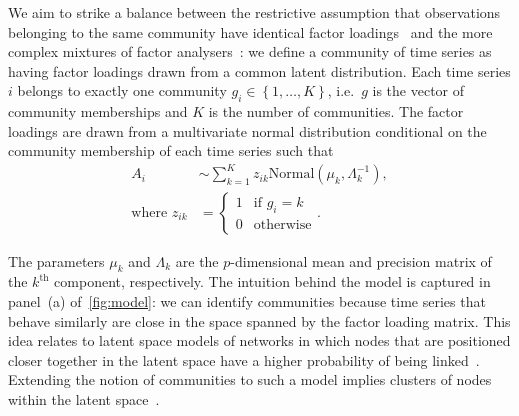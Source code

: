 \documentclass[onecolumn,pre,superscriptaddress, longbibliography, nofootinbib, notitlepage]{revtex4-1}
\newcommand{\dist}{\sim}
\newcommand{\normal}{\mathrm{Normal}}
\begin{document}
We aim to strike a balance between the restrictive assumption that observations belonging to the same community have identical factor loadings~\cite{Inoue2007} and the more complex mixtures of factor analysers~\cite{Tipping1999}: we define a community of time series as having factor loadings drawn from a common latent distribution. Each time series $i$ belongs to exactly one community $g_i\in\left\{1,\ldots,K\right\}$, i.e.\ $g$ is the vector of community memberships and $K$ is the number of communities. The factor loadings are drawn from a multivariate normal distribution conditional on the community membership of each time series such that
    \begin{align}
        A_i&\dist\sum_{k=1}^K z_{ik} \normal\left(\mu_k, \Lambda_k^{-1} \right),\label{eq:mixture-model}\\
        \text{where } z_{ik}&=\begin{cases}
            1&\text{if }g_i = k\\
            0&\text{otherwise}
        \end{cases}\nonumber.
    \end{align}
    
The parameters $\mu_k$ and $\Lambda_k$ are the $p$-dimensional mean and precision matrix of the $k^\mathrm{th}$ component, respectively. The intuition behind the model is captured in panel~(a) of~\cref{fig:model}: we can identify communities because time series that behave similarly are close in the space spanned by the factor loading matrix. This idea relates to latent space models of networks in which nodes that are positioned closer together in the latent space have a higher probability of being linked~\cite{hoff2002latent}. 
Extending the notion of communities to such a model implies clusters of nodes within the latent space~\cite{Handcock2007}. 
\end{document}
